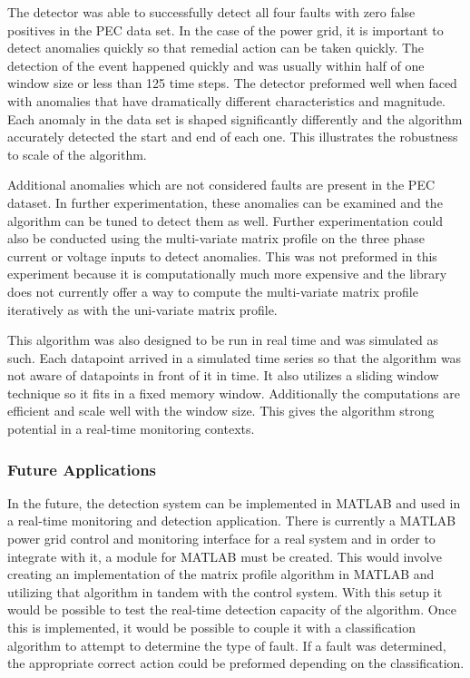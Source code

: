 The detector was able to successfully detect all four faults with zero false positives in the PEC data set. In the case of the power grid, it is important to detect anomalies quickly so that remedial action can be taken quickly.  The detection of the event happened quickly and was usually within half of one window size or less than 125 time steps. The detector preformed well when faced with anomalies that have dramatically different characteristics and magnitude. Each anomaly in the data set is shaped significantly differently and the algorithm accurately detected the start and end of each one. This illustrates the robustness to scale of the algorithm.

Additional anomalies which are not considered faults are present in the PEC dataset. In further experimentation, these anomalies can be examined and the algorithm can be tuned to detect them as well. Further experimentation could also be conducted using the multi-variate matrix profile on the three phase current or voltage inputs to detect anomalies. This was not preformed in this experiment because it is computationally much more expensive and the library does not currently offer a way to compute the multi-variate matrix profile iteratively as with the uni-variate matrix profile.

This algorithm was also designed to be run in real time and was simulated as such. Each datapoint arrived in a simulated time series so that the algorithm was not aware of datapoints in front of it in time. It also utilizes a sliding window technique so it fits in a fixed memory window. Additionally the computations are efficient and scale well with the window size. This gives the algorithm strong potential in a real-time monitoring contexts.

\subsubsection{Future Applications}
In the future, the detection system can be implemented in MATLAB and used in a real-time monitoring and detection application. There is currently a MATLAB power grid control and monitoring interface for a real system and in order to integrate with it, a module for MATLAB must be created. This would involve creating an implementation of the matrix profile algorithm in MATLAB and utilizing that algorithm in tandem with the control system. With this setup it would be possible to test the real-time detection capacity of the algorithm. Once this is implemented, it would be possible to couple it with a classification algorithm to attempt to determine the type of fault. If a fault was determined, the appropriate correct action could be preformed depending on the classification. 

